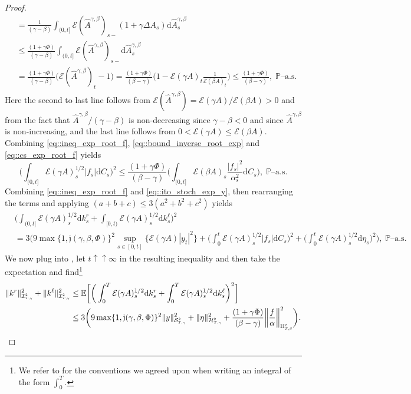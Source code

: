 \documentclass[10pt]{article} %
\newcommand\cE{\mathcal E}
\newcommand\cH{\mathcal H}
\newcommand\cI{\mathcal I}
\newcommand\cS{\mathcal S}
\newcommand{\smalltext}[1]{\text{\fontsize{4}{4}\selectfont$#1$}}
\def \E{\mathbb{E}}
\def \H{\mathbb{H}}
\def \P{\mathbb{P}}
\newcommand{\1}{\mathbf{1}}
\def\d{\mathrm{d}}
\begin{document}
\begin{proof}
\begin{align}
		&= \frac{1}{(\gamma-\beta)}\int_{(0,t]} \cE(\widehat A^{\gamma,\beta})_{s-}(1+\gamma\Delta A_s) \d \widehat A^{\gamma,\beta}_s \nonumber\\
		&\leq \frac{(1+\gamma\Phi)}{(\gamma-\beta)}\int_{(0,t]} \cE(\widehat A^{\gamma,\beta})_{s-} \d \widehat A^{\gamma,\beta}_s \nonumber\\
		&= \frac{(1+\gamma\Phi)}{(\gamma-\beta)}\big(\cE(\widehat A^{\gamma,\beta})_t - 1\big) = \frac{(1+\gamma\Phi)}{(\beta-\gamma)}\bigg(1-\cE(\gamma A)_t\frac{1}{\cE(\beta A)_t}\bigg) \leq \frac{(1+\gamma\Phi)}{(\beta-\gamma)}, \; \text{$\P$--a.s.}
	\end{align}
	Here the second to last line follows from $\cE(\widehat A^{\gamma,\beta}) = \cE(\gamma A)/\cE(\beta A) > 0$ and from the fact that $\widehat A^{\gamma,\beta} / (\gamma-\beta)$ is non-decreasing since $\gamma-\beta < 0$ and since $\widehat A^{\gamma,\beta}$ is non-increasing, and the last line follows from $0 < \cE(\gamma A) \leq \cE(\beta A)$. Combining \eqref{eq::ineq_exp_root_f}, \eqref{eq::bound_inverse_root_exp} and \eqref{eq::cs_exp_root_f} yields 
	\begin{equation}\label{eq::ineq_exp_root_f}
		\bigg(\int_{(0,t]} \cE(\gamma A)^{1/2}_s |f_s| \d C_s\bigg)^2 
		\leq \frac{(1+\gamma\Phi)}{(\beta-\gamma)} \bigg(\int_{(0,t]} \cE(\beta A)_s \frac{|f_s|^2}{\alpha^2_s} \d C_s\bigg), \; \text{$\P$--a.s.}
	\end{equation}
	Combining \eqref{eq::ineq_exp_root_f} and \eqref{eq::ito_stoch_exp_y}, then rearranging the terms and applying $(a+b+c) \leq 3(a^2+b^2+c^2)$ yields
	\begin{align}\label{eq::estimate_k}
		&\bigg(\int_{(0,t]}\cE(\gamma A)^{1/2}_s \d k^r_s + \int_{[0,t)} \cE(\gamma A)^{1/2}_s \d k^\ell_s\bigg)^2 \nonumber\\
		&= 3\Bigg( 9\max\{1, \mathfrak{j}(\gamma,\beta,\Phi)\}^2 \sup_{s \in [0,t]}\{\cE(\gamma A)|y_t|^2\} + \bigg(\int_0^t \cE(\gamma A)^{1/2}_s |f_s| \d C_s\bigg)^2 + \bigg(\int_0^t \cE(\gamma A)^{1/2}_s \d\eta_s\bigg)^2\Bigg), \; \text{$\P$--a.s.}
	\end{align}
	We now plug  into , let $t \uparrow\uparrow \infty$ in the resulting inequality and then take the expectation and find\footnote{We refer to  for the conventions we agreed upon when writing an integral of the form $\int_0^T$.}
	\begin{align*}
		\|k^r\|^2_{\cI^\smalltext{2}_{\smalltext{T}\smalltext{,}\smalltext{\gamma}}} + \|k^\ell\|^2_{\cI^\smalltext{2}_{\smalltext{T}\smalltext{,}\smalltext{\gamma}}} 
		&\leq \E\bigg[\bigg(\int_0^T\cE(\gamma A)^{1/2}_s \d k^r_s + \int_0^T \cE(\gamma A)^{1/2}_s \d k^\ell_s\bigg)^2\bigg] \\
		&\leq 3\bigg(9\max\{1,\mathfrak{j}(\gamma,\beta,\Phi)\}^2\|y\|^2_{\cS^\smalltext{2}_{\smalltext{T}\smalltext{,}\smalltext{\gamma}}} + \|\eta\|^2_{\cH^\smalltext{2}_{\smalltext{T}\smalltext{,}\smalltext{\gamma}}} + \frac{(1+\gamma\Phi)}{(\beta-\gamma)}\bigg\|\frac{f}{\alpha}\bigg\|^2_{\H^\smalltext{2}_{\smalltext{T}\smalltext{,}\smalltext{\beta}}}  \bigg).
	\end{align*}
	

\end{proof}
\end{document}
